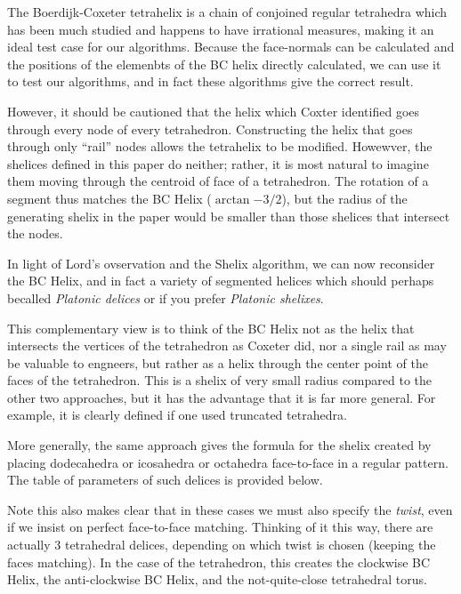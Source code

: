 \documentclass[11pt]{article}
\begin{document}
{The Boerdijk-Coxeter tetrahelix is a chain of conjoined regular tetrahedra
which has been much studied\cite{coxeter1985simplicial,sadler2013periodic,fuller1982synergetics,read2018transforming} and happens to have irrational measures, making it an ideal
test case for our algorithms. Because the face-normals can be calculated and the
positions of the elemenbts of the BC helix directly calculated, we can use
it to test our algorithms, and in fact these algorithms give the correct result.

However, it should be cautioned that the helix which Coxter identified\cite{coxeter1985simplicial} goes through every node of every tetrahedron. Constructing the helix that goes
through only ``rail'' nodes allows the tetrahelix to be modified\cite{read2018transforming}.
Howewver, the shelices defined in this paper do neither; rather, it is most natural to
imagine them moving through the centroid of face of a tetrahedron. The rotation of a
segment thus matches the BC Helix ($\arctan{-3/2}$), but the radius of the
generating shelix in the paper would be smaller than those shelices that intersect the nodes.

In light of Lord's ovservation and the Shelix algorithm, we can now
reconsider the BC Helix, and in fact a variety of segmented helices which
should perhaps becalled {\em Platonic delices} or if you prefer {\em Platonic shelixes}.

This complementary view is to think of the BC Helix not as the helix that
intersects the vertices of the tetrahedron as Coxeter did\cite{coxeter1985simplicial}, nor a single
rail as may be valuable to engneers\cite{read2018transforming}, but rather as a helix through
the center point of the faces of the tetrahedron. This is a shelix of
very small radius compared to the other two approaches, but it has
the advantage that it is far more general. For example, it is
clearly defined if one used truncated tetrahedra.

More generally, the same approach gives the formula for the shelix
created by placing dodecahedra or icosahedra or octahedra face-to-face
in a regular pattern. The table of parameters of such delices is provided
below.

Note this also makes clear that in these cases we must also specify the {\em twist},
even if we insist on perfect face-to-face matching. Thinking of it this
way, there are actually 3 tetrahedral delices, depending on which twist
is chosen (keeping the faces matching). In the case of the tetrahedron,
this creates the clockwise BC Helix, the anti-clockwise BC Helix, and the
not-quite-close tetrahedral torus.

}
\end{document}
